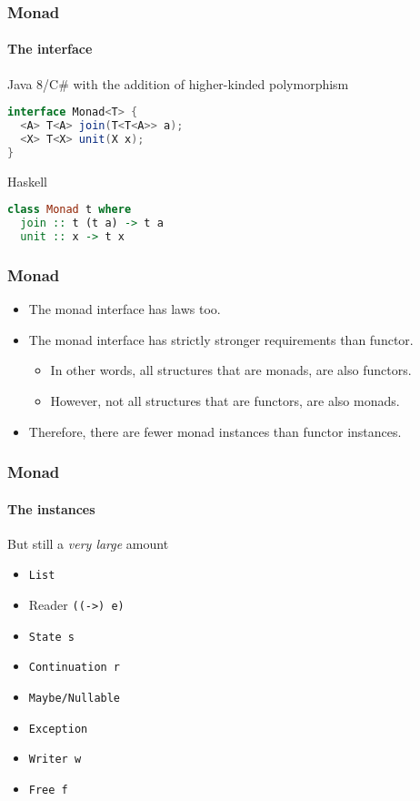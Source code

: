 \begin{frame}[fragile]
\frametitle{Monad}
\framesubtitle{The interface}
\begin{block}{Java 8/C\# with the addition of higher-kinded polymorphism}
\begin{lstlisting}[style=language,language=java]
interface Monad<T> {
  <A> T<A> join(T<T<A>> a);
  <X> T<X> unit(X x);
}
\end{lstlisting}
\end{block}
\begin{block}{Haskell}
\begin{lstlisting}[style=language,language=haskell]
class Monad t where
  join :: t (t a) -> t a
  unit :: x -> t x
\end{lstlisting}
\end{block}
\end{frame}

\begin{frame}[fragile]
\frametitle{Monad}
\begin{itemize}
\item The monad interface has laws too.
\item The monad interface has strictly stronger requirements than functor.
  \begin{itemize}
  \item In other words, all structures that are monads, are also functors.
  \item However, not all structures that are functors, are also monads.
  \end{itemize}
\item Therefore, there are fewer monad instances than functor instances.
\end{itemize}
\end{frame}

\begin{frame}[fragile]
\frametitle{Monad}
\framesubtitle{The instances}
\begin{block}{But still a \emph{very large} amount}
\begin{itemize}
\item \lstinline{List}
\item Reader \lstinline{((->) e)}
\item \lstinline{State s}
\item \lstinline{Continuation r}
\item \lstinline{Maybe/Nullable}
\item \lstinline{Exception}
\item \lstinline{Writer w}
\item \lstinline{Free f}
\end{itemize}
\end{block}
\end{frame}

